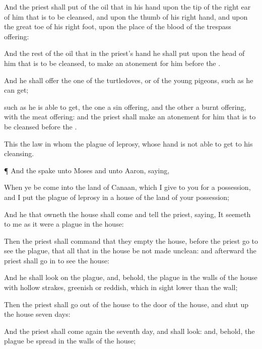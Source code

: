{And the
priest shall
put of the
oil that
{} in his
hand upon the
tip of the
right
ear of him that is to be
cleansed, and upon the
thumb of his
right
hand, and upon the great
toe of his
right
foot, upon the
place of the
blood of the trespass
offering:

And the
rest of the
oil that
{} in the
priest’s
hand he shall
put upon the
head of him that is to be
cleansed, to make an
atonement for him
before the
{}.

And he shall
offer the
one of the
turtledoves, or of the
young
pigeons, such
as he can
get;

 such as
he is able to
get, the
one
{} a sin
offering, and the
other
{} a burnt
offering, with the meat
offering: and the
priest shall make an
atonement for him that is to be
cleansed
before the
{}.

This
{} the
law
{} in whom
{} the
plague of
leprosy, whose
hand is not able to
get
{} to his
cleansing.


\par }{\PP {}¶ And the
{}
spake unto
Moses and unto
Aaron,
saying,

When ye be
come into the
land of
Canaan, which I
give to you for a
possession, and I
put the
plague of
leprosy in a
house of the
land of your
possession;

And he that owneth the
house shall
come and
tell the
priest,
saying, It
seemeth to me
{} as it were a
plague in the
house:

Then the
priest shall
command that they
empty the
house, before the
priest
go
{} to
see the
plague, that all that
{} in the
house be not made
unclean: and
afterward the
priest shall
go in to
see the
house:

And he shall
look on the
plague, and, behold,
{} the
plague
{} in the
walls of the
house with hollow
strakes,
greenish or
reddish, which in
sight
{}
lower
than the
wall;

Then the
priest shall
go out of the
house to the
door of the
house, and
shut up the
house
seven
days:

And the
priest shall come
again the
seventh
day, and shall
look: and, behold,
{} the
plague be
spread in the
walls of the
house;

}
